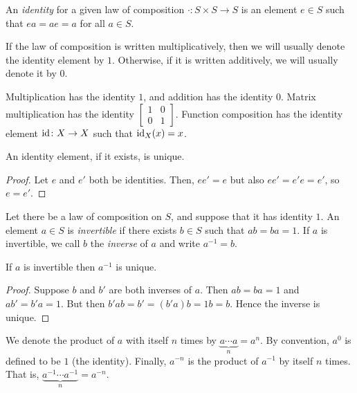 \begin{definition}
  An \emph{identity} for a given law of composition $\cdot \colon S\times S \to S$ is an element $e \in S$ such that $ea = ae = a$ for all $a \in S$.
\end{definition}

\begin{remark}
  If the law of composition is written multiplicatively, then we will usually denote the identity element by $1$. Otherwise, if it is written additively, we will usually denote it by $0$.
\end{remark}

\begin{example}
  Multiplication has the identity $1$, and addition has the identity $0$. Matrix multiplication has the identity $\begin{bmatrix} 1 & 0 \\ 0 & 1 \end{bmatrix}$. Function composition has the identity element $\operatorname{id}\colon X \to X$ such that $\operatorname{id}_X(x) = x$.
\end{example}

\begin{proposition}
  An identity element, if it exists, is unique.
\end{proposition}
\begin{proof}
  Let $e$ and $e'$ both be identities. Then, $ee' = e$ but also $ee' = e'e = e'$, so $e = e'$.
\end{proof}

\begin{definition}
  Let there be a law of composition on $S$, and suppose that it has identity $1$. An element $a \in S$ is \emph{invertible} if there exists  $b \in S$ such that $ab = ba = 1$. If $a$ is invertible, we call $b$ the \emph{inverse} of $a$ and write $a^{-1} = b$.
\end{definition}

\begin{proposition}
  If $a$ is invertible then $a^{-1}$ is unique.
\end{proposition}
\begin{proof}
  Suppose $b$ and $b'$ are both inverses of $a$. Then $ab = ba = 1$ and $ab' = b'a = 1$. But then $b'ab = b' = (b'a)b = 1b = b$. Hence the inverse is unique.
\end{proof}

\begin{remark}
  We denote the product of $a$ with itself $n$ times by $\underbrace{a\cdots a}_n = a^n$. By convention, $a^{0}$ is defined to be $1$ (the identity). Finally, $a^{-n}$ is the product of $a^{-1}$ by itself $n$ times. That is, $\underbrace{a^{-1}\cdots a^{-1}}_n = a^{-n}$.
\end{remark}

